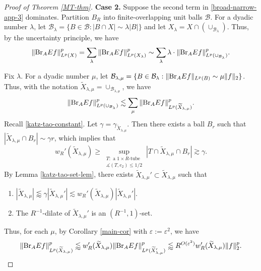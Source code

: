 \documentclass{amsart}
\numberwithin{equation}{section}
\newcommand{\ga}{\gamma}
\newcommand{\e}{\varepsilon}
\newcommand{\la}{\lambda}
\newcommand{\cb}{\mathcal B}
\newcommand{\wt}{\widetilde}
\newcommand{\ang}{\measuredangle}
\newcommand{\BR}{{\rm{Br}}}
\begin{document}
\begin{proof}[Proof of Theorem \ref{MT-thm}]
\smallskip

{\bf Case 2. } Suppose the second term in \eqref{broad-narrow-app-3} dominates.
Partition $B_R$ into finite-overlapping unit balls $\cb$.
For a dyadic number $\la$, let $\cb_\la=\{B\in\cb: |B\cap X|\sim\la |B|\}$ and let $X_\la=X\cap (\cup_{\cb_\la})$.
Thus, by the uncertainty principle, we have
\begin{equation}
\label{sum-lambda}
    \|\BR_{A}Ef\|_{L^p(X)}^p=\sum_{\la}\|\BR_{A}Ef\|_{L^p(X_\la)}^p\sim\sum_{\la}\la\cdot\|\BR_{A}Ef\|_{L^p(\cup_{\cb_\la})}^p.
\end{equation}

Fix $\la$.
For a dyadic number $\mu$, let $\cb_{\la,\mu}=\{B\in\cb_\la: \|\BR_{A}Ef\|_{L^p(B)}\sim\mu\|f\|_2\}$.
Thus, with the notation $\wt X_{\la,\mu}=\cup_{\cb_{\la,\mu}}$, we have
\begin{equation}
\label{sum-mu}
    \|\BR_{A}Ef\|_{L^p(\cup_{\cb_\la})}^p\lesssim \sum_\mu\|\BR_{A}Ef\|_{L^p(\wt X_{\la,\mu})}^p.
\end{equation}
Recall \eqref{katz-tao-constant}.
Let $\ga=\ga_{\wt X_{\la,\mu}}$.
Then there exists a ball $B_r$ such that $|\wt X_{\la,\mu}\cap B_r|\sim \ga r$, which implies that
\begin{equation}
    w_R'(\wt X_{\la,\mu})\geq\sup_{\substack{T:\text{ a $1\times R$-tube}\\ \ang(T, e_2)\leq 1/2}}|T\cap \wt X_{\la,\mu}\cap B_r|\gtrsim \ga.
\end{equation}
By Lemma \ref{katz-tao-set-lem}, there exists $\wt X_{\la,\mu}'\subset\wt X_{\la,\mu}$ such that
\begin{enumerate}
    \item $|\wt X_{\la,\mu}|\lessapprox \ga|\wt X_{\la,\mu}'|\lesssim w_R'(\wt X_{\la,\mu})|\wt X_{\la,\mu}'|$.
    \item The $R^{-1}$-dilate of $\wt X_{\la,\mu}'$ is an $(R^{-1},1)$-set.
\end{enumerate}
Thus, for each $\mu$, by Corollary \ref{main-cor} with $\e:=\e^2$, we have 
\begin{align}
\label{main-thm-app-3}
    \|\BR_{A}Ef\|_{L^p(\wt X_{\la,\mu})}^p\lessapprox w_R'(\wt X_{\la,\mu})\|\BR_{A}Ef\|_{L^p(\wt X_{\la,\mu}')}^p\lessapprox R^{O(\e^2)} w_R'(\wt X_{\la,\mu})\|f\|_2^p.
\end{align}


\end{proof}
\end{document}
